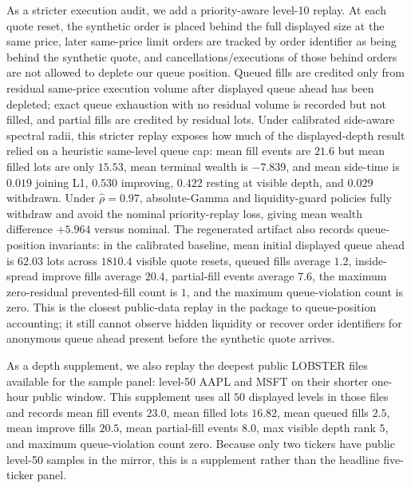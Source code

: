 \documentclass[review]{siamonline250211}
\begin{document}
As a stricter execution audit, we add a priority-aware level-10 replay. At each
quote reset, the synthetic order is placed behind the full displayed size at
the same price, later same-price limit orders are tracked by order identifier
as being behind the synthetic quote, and cancellations/executions of those
behind orders are not allowed to deplete our queue position. Queued fills are
credited only from residual same-price execution volume after displayed queue
ahead has been depleted; exact queue exhaustion with no residual volume is
recorded but not filled, and partial fills are credited by residual lots. Under
calibrated side-aware spectral radii, this stricter replay exposes how much of
the displayed-depth result relied on a heuristic same-level queue cap: mean fill
events are $21.6$ but mean filled lots are only $15.53$, mean terminal wealth is
$-7.839$, and mean side-time is $0.019$ joining L1, $0.530$ improving,
$0.422$ resting at visible depth, and $0.029$ withdrawn. Under
$\hat\rho=0.97$, absolute-Gamma and liquidity-guard policies fully withdraw
and avoid the nominal priority-replay loss, giving mean wealth difference
$+5.964$ versus nominal. The regenerated artifact also records queue-position
invariants: in the calibrated baseline, mean initial displayed queue ahead is
$62.03$ lots across $1810.4$ visible quote resets, queued fills average $1.2$,
inside-spread improve fills average $20.4$, partial-fill events average $7.6$,
the maximum zero-residual prevented-fill count is $1$, and the maximum
queue-violation count is zero. This is the closest public-data replay in the
package to queue-position accounting; it still cannot observe hidden liquidity
or recover order identifiers for anonymous queue ahead present before the
synthetic quote arrives.

As a depth supplement, we also replay the deepest public LOBSTER files available
for the sample panel: level-50 AAPL and MSFT on their shorter one-hour public
window. This supplement uses all $50$ displayed levels in those files and
records mean fill events $23.0$, mean filled lots $16.82$, mean queued fills
$2.5$, mean improve fills $20.5$, mean partial-fill events $8.0$, max visible
depth rank $5$, and maximum queue-violation count zero. Because only two tickers
have public level-50 samples in the mirror, this is a supplement rather than the
headline five-ticker panel.
\end{document}
